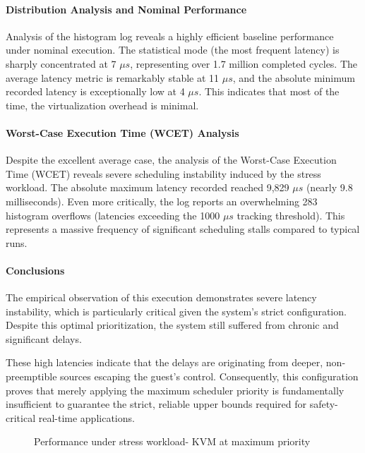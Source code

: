 \paragraph{Distribution Analysis and Nominal
Performance}\label{distribution-analysis-and-nominal-performance-2}

Analysis of the histogram log reveals a highly efficient baseline
performance under nominal execution. The statistical mode (the most
frequent latency) is sharply concentrated at 7 $\mu s$, representing over 1.7
million completed cycles. The average latency metric is remarkably
stable at 11 $\mu s$, and the absolute minimum recorded latency is
exceptionally low at 4 $\mu s$. This indicates that most of the time, the
virtualization overhead is minimal.

\paragraph{Worst-Case Execution Time (WCET)
Analysis}\label{worst-case-execution-time-wcet-analysis-5}

Despite the excellent average case, the analysis of the Worst-Case
Execution Time (WCET) reveals severe scheduling instability induced by
the stress workload. The absolute maximum latency recorded reached 9,829
$\mu s$ (nearly 9.8 milliseconds). Even more critically, the log reports an
overwhelming 283 histogram overflows (latencies exceeding the 1000 $\mu s$
tracking threshold). This represents a massive frequency of significant
scheduling stalls compared to typical runs.

\paragraph{Conclusions}\label{conclusions-3}

The empirical observation of this execution demonstrates severe latency
instability, which is particularly critical given the system's strict
configuration. Despite this optimal prioritization, the system still
suffered from chronic and significant delays.

These high latencies indicate that the delays are originating from
deeper, non-preemptible sources escaping the guest's control.
Consequently, this configuration proves that merely applying the maximum
scheduler priority is fundamentally insufficient to guarantee the
strict, reliable upper bounds required for safety-critical real-time
applications.

\begin{figure}
\centering

\caption{Performance under stress workload- KVM at maximum priority}
\end{figure}

